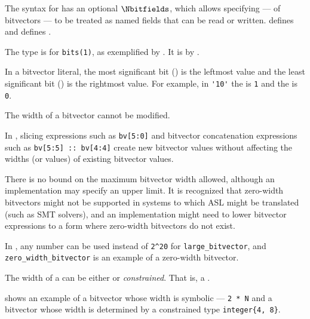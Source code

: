 %
The syntax for \bitvectortypesterm{} has an optional $\Nbitfields$,
which allows specifying \emph{\bitfieldsterm} ---
\bitslicesterm{} of bitvectors --- to be treated as named
fields that can be read or written.
 defines \bitfieldsterm{}
and  defines \bitslicesterm{}.

The \Tbit{} type is \syntacticsugar{} for \texttt{bits(1)},
as exemplified by .
It is \desugared{} by .


In a bitvector literal, the most significant bit (\ProseMSB) is the leftmost value
and the least significant bit (\ProseLSB) is the rightmost value.
For example, in \verb|'10'| the \ProseMSB{} is \verb|1| and the \ProseLSB{} is \verb|0|.

The width of a bitvector cannot be modified.

In , slicing expressions such as \verb|bv[5:0]|
and bitvector concatenation expressions such as \verb|bv[5:5] :: bv[4:4]|
create new bitvector values without affecting the widths (or values)
of existing bitvector values.

There is no bound on the maximum bitvector width allowed, although an implementation may specify an upper
limit.
It is recognized that zero-width bitvectors might not be supported in systems
to which ASL might be translated (such as SMT solvers),
and an implementation might need to lower bitvector
expressions to a form where zero-width bitvectors do not exist.

In , any number can be used instead of \verb|2^20| for
\verb|large_bitvector|, and \verb|zero_width_bitvector| is an example of a zero-width bitvector.


The width of a \bitvectortypeterm{} can be either \staticallyevaluableterm{}
or \emph{constrained}. That is, a \symbolicallyevaluableterm{} \constrainedintegerterm{}.

 shows an example of a bitvector whose width
is symbolic --- \verb|2 * N| and a bitvector whose width is determined
by a constrained type \verb|integer{4, 8}|.

